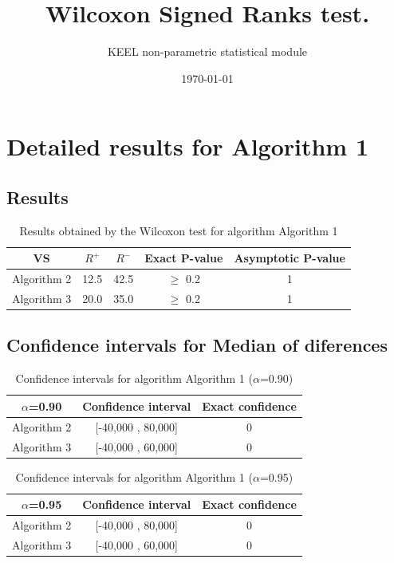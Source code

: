 \documentclass[a4paper,10pt]{article}
\title{Wilcoxon Signed Ranks test.}
\date{\today}
\author{KEEL non-parametric statistical module}
\begin{document}
\pagestyle{empty}
\maketitle
\thispagestyle{empty}



\section{Detailed results for Algorithm 1}


\subsection{Results}

\begin{table}[!htp]
\centering\small
\begin{tabular}{
|c|c|c|c|c|}
\hline
 VS & $R^{+}$ & $R^{-}$ & Exact P-value & Asymptotic P-value \\ \hline 
Algorithm 2 & 12.5 & 42.5 & $\geq$ 0.2 & 1\\ \hline 
Algorithm 3 & 20.0 & 35.0 & $\geq$ 0.2 & 1\\ \hline 

\end{tabular}
\caption{Results obtained by the Wilcoxon test for algorithm Algorithm 1}
\end{table}

\subsection{Confidence intervals for Median of diferences}

\begin{table}[!htp]
\centering\small
\begin{tabular}{
|c|c|c|}
\hline
 $\alpha$=0.90 & Confidence interval & Exact confidence \\ \hline 
Algorithm 2 & [-40,000 , 80,000] & 0\\ \hline 
Algorithm 3 & [-40,000 , 60,000] & 0\\ \hline 

\end{tabular}
\caption{Confidence intervals for algorithm Algorithm 1 ($\alpha$=0.90)}
\end{table}
\begin{table}[!htp]
\centering\small
\begin{tabular}{
|c|c|c|}
\hline
 $\alpha$=0.95 & Confidence interval & Exact confidence \\ \hline 
Algorithm 2 & [-40,000 , 80,000] & 0\\ \hline 
Algorithm 3 & [-40,000 , 60,000] & 0\\ \hline 

\end{tabular}
\caption{Confidence intervals for algorithm Algorithm 1 ($\alpha$=0.95)}
\end{table}
\end{document}
